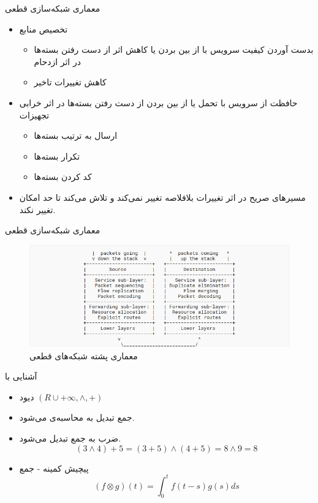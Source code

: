 \documentclass[dvipsnames]{beamer}
\makeatletter
\newcommand{\RTList}{\raggedleft\rightskip\@totalleftmargin}
\makeatother
\begin{document}
\begin{persian}
	\begin{frame}{معماری شبکه‌سازی قطعی}
		\begin{itemize}\RTList{}
			\justifying%
			\item تخصیص منابع
			\begin{itemize}\RTList{}
			  \item بدست آوردن کیفیت سرویس با از بین بردن یا کاهش اثر از دست رفتن بسته‌ها در اثر ازدحام
			  \item کاهش تغییرات تاخیر
			\end{itemize}
		  \item حافظت از سرویس با تحمل یا از بین بردن از دست رفتن بسته‌ها در اثر خرابی تجهیزات
		  \begin{itemize}\RTList{}
			\item ارسال به ترتیب بسته‌ها
			\item تکرار بسته‌ها
			\item کد کردن بسته‌ها
		  \end{itemize}
		  \item مسیرهای صریح در اثر تغییرات بلافلاصه تغییر نمی‌کند و تلاش می‌کند تا حد امکان تغییر نکند.
		\end{itemize}
	\end{frame}

	\begin{frame}{معماری شبکه‌سازی قطعی}
		\begin{center}\begin{figure}
			\includegraphics[scale=0.4]{images/detnet-stack.png}
			\caption{معماری پشته شبکه‌های قطعی}
		\end{figure}\end{center}
	\end{frame}

	\begin{frame}{آشنایی با }
		\begin{itemize}\RTList{}
			\justifying%
			\item دیود \((R \cup +\infty, \wedge, +)\)
			\item جمع تبدیل به محاسبه‌ی  می‌شود.
			\item ضرب به جمع تبدیل می‌شود.
			\[ (3\wedge4) + 5 = (3 + 5) \wedge (4 + 5) = 8 \wedge 9 = 8 \]
			\item پیچیش کمینه - جمع
			\[ (f \otimes g)(t) = \int_{0}^{t} f(t-s)g(s)ds \]
		\end{itemize}
	\end{frame}


\end{persian}
\end{document}
